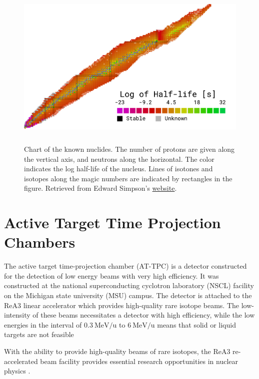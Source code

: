 \begin{figure}
\centering
\includegraphics[width=\textwidth, height=8cm]{../plots/chart}
\caption[Chart of the nuclides]{Chart of the known nuclides. The number of protons are given along the vertical axis, and neutrons along the horizontal. The color indicates the log half-life of the nucleus. Lines of isotones and isotopes along the magic numbers are indicated by rectangles in the figure. Retrieved from Edward Simpson's \href{https://people.physics.anu.edu.au/~ecs103/chart/}{website}.}
\end{figure}

\section{Active Target Time Projection Chambers}\label{sec:attpc}

The active target time-projection chamber (AT-TPC) is a detector constructed for the detection of low energy beams with very high efficiency. It was constructed at the national superconducting cyclotron laboratory (NSCL) facility on the Michigan state university (MSU) campus. The detector is attached to the ReA3 linear accelerator which provides high-quality rare isotope beams. The low-intensity of these beams necessitates a detector with high efficiency, while the low energies in the interval of $\SI[per-mode=symbol]{0.3}{\MeV \per \atomicmassunit}$ to $\SI[per-mode=symbol]{6}{\MeV \per \atomicmassunit}$ means that solid or liquid targets are not feasible \cite{Bradt2017a}

 With the ability to provide high-quality beams of rare isotopes, the ReA3 re-accelerated beam facility provides essential research opportunities in nuclear physics \cite{Kester2010}. 

